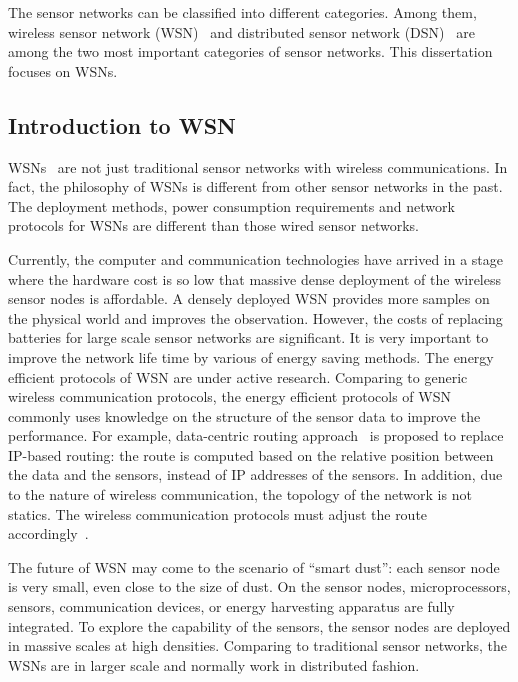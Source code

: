 The sensor networks can be classified into different categories. Among them, wireless sensor network (WSN)~\cite{ZhaoGuibasWSN2004,akyldizSurvey} and distributed sensor network (DSN)~\cite{Qi01survey} are among the two most important categories of sensor networks. This dissertation focuses on WSNs.


\subsection{Introduction to WSN}
WSNs~\cite{ZhaoGuibasWSN2004,akyldizSurvey,Estrin01Instrumenting} are not just traditional sensor networks with wireless communications. In fact, the philosophy of WSNs is different from other sensor networks in the past. The deployment methods, power consumption requirements and network protocols for WSNs are different than those wired sensor networks.

    Currently, the computer and communication technologies have arrived in a stage where the hardware cost is so low that massive dense deployment of the wireless sensor nodes is affordable. A densely deployed WSN provides more samples on the physical world and improves the observation. However, the costs of replacing batteries for large scale sensor networks are significant.
    It is very important to improve the network life time by various of energy saving methods.
      The energy efficient protocols of WSN are under active research. Comparing to generic wireless communication protocols, the energy efficient protocols of WSN commonly uses knowledge on the structure of the sensor data to improve the performance. For example, data-centric routing approach~\cite{Krishnamachari_infocom02} is proposed to replace IP-based routing: the route is computed based on the relative position between the data and the sensors, instead of IP addresses of the sensors. In addition, due to the nature of wireless communication, the topology of the network is not statics. The wireless communication protocols must adjust the route accordingly~\cite{rangwala06}.

    The future of WSN may come to the scenario of ``smart dust''\cite{PisterSmartdust01}: each sensor node is very small, even close to the size of dust. On the sensor nodes, microprocessors, sensors, communication devices, or energy harvesting apparatus are fully integrated. To explore the capability of the sensors, the sensor nodes are deployed in massive scales at high densities. Comparing to traditional sensor networks, the WSNs are in larger scale and normally work in distributed fashion.



